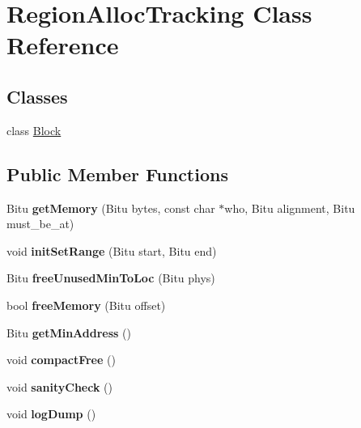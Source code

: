 \hypertarget{classRegionAllocTracking}{\section{Region\-Alloc\-Tracking Class Reference}
\label{classRegionAllocTracking}
}
\subsection*{Classes}
\begin{DoxyCompactItemize}
\item 
class \hyperlink{classRegionAllocTracking_1_1Block}{Block}
\end{DoxyCompactItemize}
\subsection*{Public Member Functions}
\begin{DoxyCompactItemize}
\item 
\hypertarget{classRegionAllocTracking_a8316dd0bc8bdccbba7dc2e2fa1bdddf9}{Bitu {\bfseries get\-Memory} (Bitu bytes, const char $\ast$who, Bitu alignment, Bitu must\-\_\-be\-\_\-at)}\label{classRegionAllocTracking_a8316dd0bc8bdccbba7dc2e2fa1bdddf9}

\item 
\hypertarget{classRegionAllocTracking_adf0ba1caebd75092d0ac8d1ed8e0ffba}{void {\bfseries init\-Set\-Range} (Bitu start, Bitu end)}\label{classRegionAllocTracking_adf0ba1caebd75092d0ac8d1ed8e0ffba}

\item 
\hypertarget{classRegionAllocTracking_a378d5977d818d2ed7092c221b5fe545f}{Bitu {\bfseries free\-Unused\-Min\-To\-Loc} (Bitu phys)}\label{classRegionAllocTracking_a378d5977d818d2ed7092c221b5fe545f}

\item 
\hypertarget{classRegionAllocTracking_a1ec60e95f84bace72cd288650e86898f}{bool {\bfseries free\-Memory} (Bitu offset)}\label{classRegionAllocTracking_a1ec60e95f84bace72cd288650e86898f}

\item 
\hypertarget{classRegionAllocTracking_abdf8796d9c948134250394b1e92ae7cc}{Bitu {\bfseries get\-Min\-Address} ()}\label{classRegionAllocTracking_abdf8796d9c948134250394b1e92ae7cc}

\item 
\hypertarget{classRegionAllocTracking_a9c06917d051db2d1234f3f05ed8ded87}{void {\bfseries compact\-Free} ()}\label{classRegionAllocTracking_a9c06917d051db2d1234f3f05ed8ded87}

\item 
\hypertarget{classRegionAllocTracking_a18edf90722613111a2f7aadc3f3d3dd2}{void {\bfseries sanity\-Check} ()}\label{classRegionAllocTracking_a18edf90722613111a2f7aadc3f3d3dd2}

\item 
\hypertarget{classRegionAllocTracking_a6530697233edb71c6059395f6a903c47}{void {\bfseries log\-Dump} ()}\label{classRegionAllocTracking_a6530697233edb71c6059395f6a903c47}

\end{DoxyCompactItemize}

